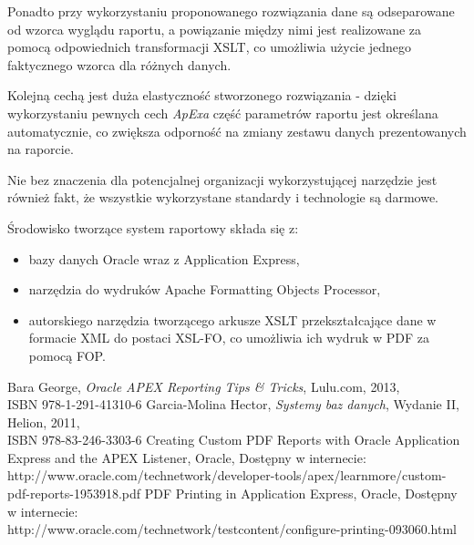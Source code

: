 \documentclass[11pt,a4paper]{article}
\begin{document}
Ponadto przy wykorzystaniu proponowanego rozwiązania dane są odseparowane od wzorca wyglądu raportu, a powiązanie między nimi jest realizowane za pomocą odpowiednich transformacji XSLT, co umożliwia użycie jednego faktycznego wzorca dla różnych danych.  

Kolejną cechą jest duża elastyczność stworzonego rozwiązania - dzięki wykorzystaniu pewnych cech \emph{ApExa} część parametrów raportu jest określana automatycznie, co zwiększa odporność na zmiany zestawu danych prezentowanych na raporcie. 

Nie bez znaczenia dla potencjalnej organizacji wykorzystującej narzędzie jest również fakt, że wszystkie wykorzystane standardy i technologie są darmowe. 

\bigskip
Środowisko tworzące system raportowy składa się z:
\begin{itemize}
	\item bazy danych Oracle wraz z Application Express,
	\item narzędzia do wydruków Apache Formatting Objects Processor,
	\item autorskiego narzędzia tworzącego arkusze XSLT przekształcające dane w formacie XML do postaci XSL-FO, co umożliwia ich wydruk w PDF za pomocą FOP.
\end{itemize}

\newpage

\begin{thebibliography}{9}

 Bara George, \emph{Oracle APEX Reporting Tips \& Tricks}, Lulu.com, 2013,\\ISBN 978-1-291-41310-6
 Garcia-Molina Hector, \emph{Systemy baz danych}, Wydanie II, Helion, 2011,\\ ISBN 978-83-246-3303-6
 Creating Custom PDF Reports with Oracle Application Express and the APEX Listener, Oracle, Dostępny w internecie:\\http://www.oracle.com/technetwork/developer-tools/apex/learnmore/custom-pdf-reports-1953918.pdf
 PDF Printing in Application Express, Oracle, Dostępny w internecie: \\http://www.oracle.com/technetwork/testcontent/configure-printing-093060.html
\end{thebibliography}
\newpage


\appendix
\end{document}
